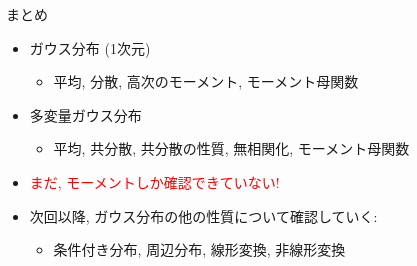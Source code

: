 \documentclass[dvipdfmx,notheorems,t]{beamer}
\begin{document}
\begin{frame}{まとめ}
\begin{itemize}
  \item ガウス分布 (1次元)
  \begin{itemize}
    \item 平均, 分散, 高次のモーメント, モーメント母関数
  \end{itemize}
  \item 多変量ガウス分布
  \begin{itemize}
    \item 平均, 共分散, 共分散の性質, 無相関化, モーメント母関数
  \end{itemize}
  \item \textcolor{red}{まだ, モーメントしか確認できていない!}
  \item 次回以降, ガウス分布の他の性質について確認していく:
  \begin{itemize}
    \item 条件付き分布, 周辺分布, 線形変換, 非線形変換
  \end{itemize}
\end{itemize}
\end{frame}
\end{document}
